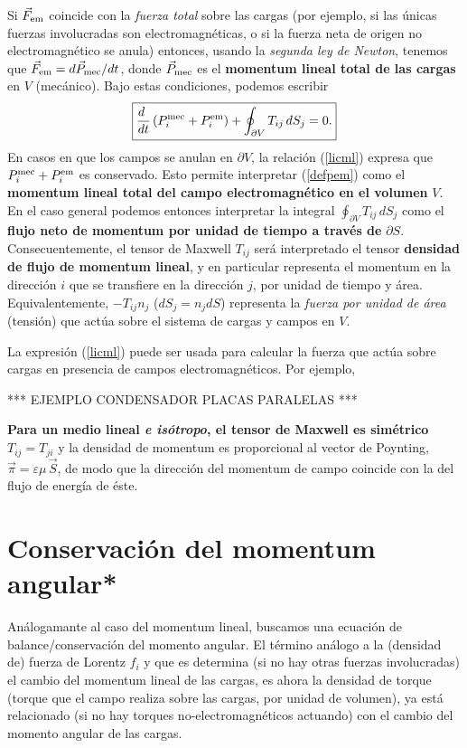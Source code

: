 Si $\vec{F}_{\rm em}$ coincide con la \textit{fuerza total} sobre las cargas (por ejemplo, si las únicas fuerzas involucradas son electromagnéticas, o si la fuerza neta de origen no electromagnético se anula) entonces, usando la \textit{segunda ley de Newton}, tenemos que $\vec{F}_{\rm em}=d\vec{P}_{\rm mec}/dt$, donde $\vec{P}_{\rm mec}$ es el \textbf{momentum lineal total de las cargas} en $V$ (mecánico). Bajo estas condiciones, podemos escribir
\begin{equation}
\boxed{\frac{d\ }{dt}\left(P_i^{\rm mec}+P_i^{\rm em}\right)+\oint_{\partial
V}T_{ij}\,dS_j =0.} \label{licml}
\end{equation}
En casos en que los campos se anulan en $\partial V$, la relación
(\ref{licml}) expresa que $P_i^{\rm mec}+P_i^{\rm em}$ es conservado. Esto
permite interpretar (\ref{defpem}) como el \textbf{momentum lineal total del
campo electromagnético en el volumen} $V$. En el caso general podemos entonces interpretar la integral $\oint_{\partial V}T_{ij}\,dS_j $ como el \textbf{flujo neto de momentum por unidad de tiempo
a través de} $\partial S$. Consecuentemente, el tensor de Maxwell $T_{ij}$
será interpretado el tensor \textbf{densidad de flujo de momentum lineal}, y en particular representa el momentum en la dirección $i$ que se transfiere en la dirección $j$, por unidad de tiempo y área. Equivalentemente, $-T_{ij}n_j$ ($dS_j=n_jdS$)
representa la \textit{fuerza por unidad de área} (tensión) que actúa sobre el sistema
de cargas y campos en $V$.

La expresión (\ref{licml}) puede ser usada para calcular la fuerza que actúa
sobre cargas en presencia de campos electromagnéticos. Por ejemplo,

\begin{center}
*** EJEMPLO CONDENSADOR PLACAS PARALELAS ***
\end{center}

\textbf{Para un medio lineal \textit{e isótropo}, el tensor de Maxwell es simétrico
$T_{ij}=T_{ji}$} y la densidad de momentum es proporcional al vector de
Poynting, $\vec{\pi}=\varepsilon\mu\,\vec{S}$, de modo que la dirección del
momentum de campo coincide con la del flujo de energía de
éste.

\section{Conservación del momentum angular*}\label{sec:momentum_angular}
Análogamante al caso del momentum lineal, buscamos una ecuación de balance/conservación del momento angular. El término análogo a la (densidad de) fuerza de Lorentz $f_i$ y que es determina (si no hay otras fuerzas involucradas) el cambio del momentum lineal de las cargas, es ahora la densidad de torque (torque que el campo realiza sobre las cargas, por unidad de volumen), ya está relacionado (si no hay torques no-electromagnéticos actuando) con el cambio del momento angular de las cargas.

